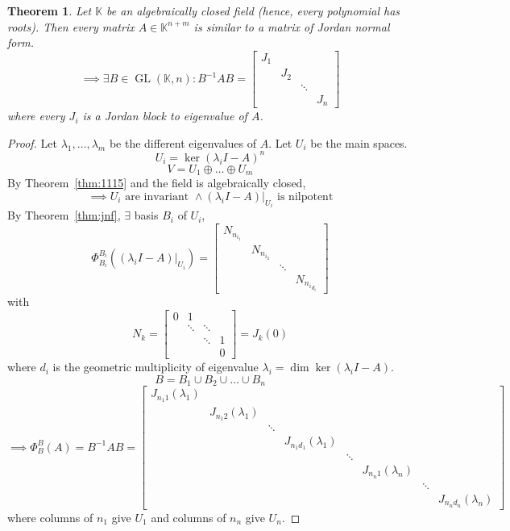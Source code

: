 \documentclass{article}
\newcounter{lecref}[section]
\numberwithin{lecref}{section}
\newtheorem{theorem}[lecref]{Theorem}
\begin{document}
\begin{theorem} %
  Let $\mathbb K$ be an algebraically closed field (hence, every polynomial has roots).
  Then every matrix $A \in \mathbb K^{n+m}$ is similar to a matrix of Jordan normal form.
  \[
    \implies \exists B \in \operatorname{GL}(\mathbb K, n): B^{-1} AB =
    \begin{bmatrix}
      J_1 & & & \\
        & J_2 & & \\
        & & \ddots & \\
        & & & J_n
    \end{bmatrix}
  \]
  where every $J_i$ is a Jordan block to eigenvalue of $A$.
\end{theorem}

\begin{proof}
  Let $\lambda_1, \dots, \lambda_m$ be the different eigenvalues of $A$. Let $U_i$ be the main spaces. %
  \[ U_i = \ker(\lambda_i I - A)^n \]
  \[ V = U_1 \oplus \dots \oplus U_m \]
  By Theorem~\ref{thm:1115} and the field is algebraically closed,
  \[ \implies U_i \text{ are invariant } \land (\lambda_i I - A)|_{U_i} \text{ is nilpotent} \]
  By Theorem~\ref{thm:jnf}, $\exists$ basis $B_i$ of $U_i$,
  \[
    \Phi_{B_i}^{B_i}\left((\lambda_i I - A)|_{U_i}\right) = \begin{bmatrix}
      N_{n_{i_1}} & & & \\
      & N_{n_{i_2}} & & \\
      & & \ddots & \\
      & & & N_{{n_i}_{d_i}}
    \end{bmatrix}
  \]
  with
  \[ N_k = \begin{bmatrix} 0 & 1 & & \\ & \ddots & \ddots & \\ & & \ddots & 1 \\ & & & 0 \end{bmatrix} = J_k(0) \]
  where $d_i$ is the geometric multiplicity of eigenvalue $\lambda_i = \dim{\ker(\lambda_i I - A)}$.
  \[ B = B_1 \cup B_2 \cup \dots \cup B_n \]
  \[
    \implies \Phi_B^B(A) = B^{-1} AB = \begin{bmatrix}
      J_{n_{1} 1}(\lambda_1) & & & & & & & \\
      & J_{n_{1} 2}(\lambda_1) & & & & & & \\
      & & \ddots & & & & & \\
      & & & J_{n_{1} d_1}(\lambda_1) & & & & \\
      & & & & \ddots & & & \\
      & & & & & J_{n_n 1}(\lambda_n) & & \\
      & & & & & & \ddots & \\
      & & & & & & & J_{n_n d_n}(\lambda_n)
    \end{bmatrix}
  \]
  where columns of $n_1$ give $U_1$ and columns of $n_n$ give $U_n$.
\end{proof}
\end{document}
